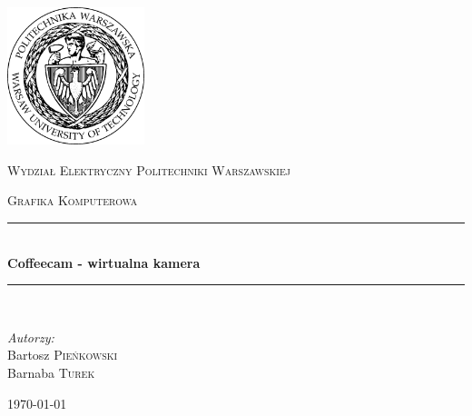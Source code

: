 \documentclass[a4paper]{article}
\newcommand{\HRule}{\rule{\linewidth}{0.5mm}}
\begin{document}
\begin{titlepage}
  
  \begin{center}
    
    
    \includegraphics[width=0.3\textwidth]{logo.jpg}\\[1cm]    
    
    \begin{onehalfspace}
    \textsc{\LARGE Wydział Elektryczny Politechniki Warszawskiej}\\[1.5cm]
    \end{onehalfspace}
    

    
    \textsc{\Large Grafika Komputerowa}\\[0.5cm]
    
    
    \HRule \\[0.4cm]
    { \huge \bfseries Coffeecam - wirtualna kamera}\\[0.2cm]
    \HRule \\[1.5cm]
    
      \begin{flushleft} \large
        \emph{Autorzy:}\\
        Bartosz \textsc{Pieńkowski} \\
        Barnaba \textsc{Turek}
      \end{flushleft}
    \vfill
    
    {\large \today}
    
  \end{center}
  
\end{titlepage}
\sloppy
\end{document}
